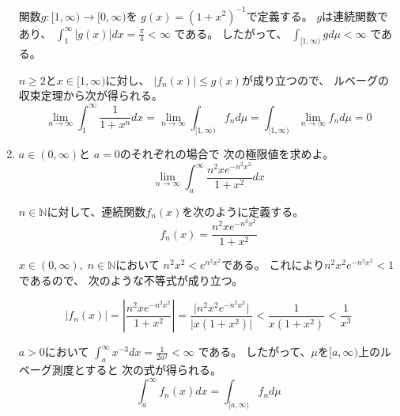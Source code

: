 \documentclass[12pt,b5paper]{ltjsarticle}
\begin{document}
\begin{enumerate}
      関数$g:[1,\infty) \to [0,\infty)$を
      $g(x)=(1+x^{2})^{-1}$で定義する。
      $g$は連続関数であり、
      $\int_{1}^{\infty}\lvert g(x) \rvert dx = \frac{\pi}{4} < \infty$
      である。
      したがって、
      $\int_{[1,\infty)} g d\mu < \infty$
      である。

      $n\geq 2$と$x\in [1,\infty)$に対し、
      $\lvert f_{n}(x) \rvert \leq g(x)$が成り立つので、
      ルベーグの収束定理から次が得られる。
      \begin{equation}
       \lim_{n\to \infty}
        \int_{1}^{\infty} \frac{1}{1+x^{n}}dx
        =
        \lim_{n\to \infty}
        \int_{[1,\infty)} f_{n} d\mu
        =
        \int_{[1,\infty)} \lim_{n\to \infty} f_{n} d\mu
        =0
      \end{equation}

      \hrulefill

 \item
      $a\in (0,\infty)$と
      $a=0$のそれぞれの場合で
      次の極限値を求めよ。
      \begin{equation}
       \lim_{n\to \infty}
        \int_{a}^{\infty} \frac{n^{2} x e^{-n^{2}x^{2}}}{1+x^{2}}dx
      \end{equation}

      \dotfill

      $n\in\mathbb{N}$に対して、連続関数$f_{n}(x)$を次のように定義する。
      \begin{equation}
       f_{n}(x) = \frac{n^{2} x e^{-n^{2}x^{2}}}{1+x^{2}}
      \end{equation}

      $x\in (0,\infty),\; n\in\mathbb{N}$において
      $n^{2}x^{2} < e^{n^{2}x^{2}}$である。
      これにより$n^{2}x^{2}e^{-n^{2}x^{2}} < 1$であるので、
      次のような不等式が成り立つ。

      \begin{equation}
       \lvert f_{n}(x) \rvert
        = \left\lvert \frac{n^{2} x e^{-n^{2}x^{2}}}{1+x^{2}} \right\rvert
        = \frac{\lvert n^{2} x^{2} e^{-n^{2}x^{2}}\rvert}{\lvert x(1+x^{2})\rvert}
        < \frac{1}{x(1+x^{2})}
        < \frac{1}{x^{3}}
      \end{equation}


      $a>0$において
      $\int_{a}^{\infty} x^{-3} dx = \frac{1}{2a^2} < \infty$
      である。
      したがって、$\mu$を$[a,\infty)$上のルベーグ測度とすると
      次の式が得られる。
      \begin{equation}
       \int_{a}^{\infty} f_{n}(x) dx = \int_{[a,\infty)} f_{n} d\mu
      \end{equation}



\end{enumerate}
\end{document}
